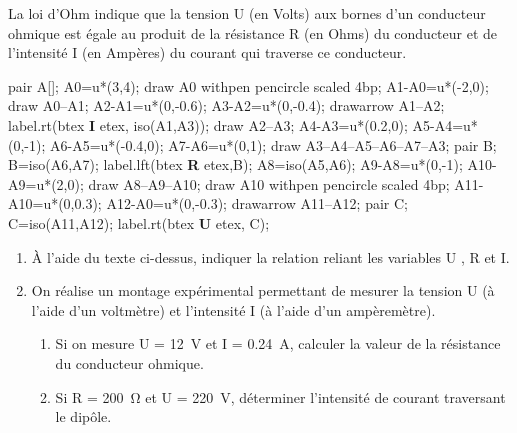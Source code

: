 \begin{exercice*}
    La loi d'Ohm indique que la tension U (en Volts) aux bornes d'un conducteur ohmique est égale au produit de la résistance R (en Ohms) du
    conducteur et de l'intensité I (en Ampères) du courant qui traverse ce conducteur.\par
    \vspace*{-5mm}
    \begin{center}
        \begin{Geometrie}            
            pair A[];
            A0=u*(3,4);
            draw A0 withpen pencircle scaled 4bp;
            A1-A0=u*(-2,0);
            draw A0--A1;
            A2-A1=u*(0,-0.6);
            A3-A2=u*(0,-0.4);
            drawarrow A1--A2;
            label.rt(btex \textbf{I} etex, iso(A1,A3));
            draw A2--A3;
            A4-A3=u*(0.2,0);
            A5-A4=u*(0,-1);
            A6-A5=u*(-0.4,0);
            A7-A6=u*(0,1);
            draw A3--A4--A5--A6--A7--A3;
            pair B;
            B=iso(A6,A7);
            label.lft(btex \textbf{R} etex,B);
            A8=iso(A5,A6);
            A9-A8=u*(0,-1);
            A10-A9=u*(2,0);
            draw A8--A9--A10;
            draw A10 withpen pencircle scaled 4bp;
            A11-A10=u*(0,0.3);
            A12-A0=u*(0,-0.3);
            drawarrow A11--A12;
            pair C;
            C=iso(A11,A12);
            label.rt(btex \textbf{U} etex, C);
        \end{Geometrie}
    \end{center}
    \vspace*{-8mm}
    \begin{enumerate}
        \item À l'aide du texte ci-dessus, indiquer la relation reliant les variables U , R et I.
        \item On réalise un montage expérimental permettant de mesurer la tension U (à l'aide d'un voltmètre) et l'intensité I (à l'aide d'un ampèremètre).
        \begin{enumerate}
            \item Si on mesure U = \SI{12}{V} et I = \SI{0.24}{A}, calculer la valeur de la résistance du conducteur ohmique.
            \item Si R = \SI{200}{\ohm} et U = \SI{220}{V}, déterminer l'intensité de courant traversant le dipôle.
        \end{enumerate}
    \end{enumerate}
\end{exercice*}
